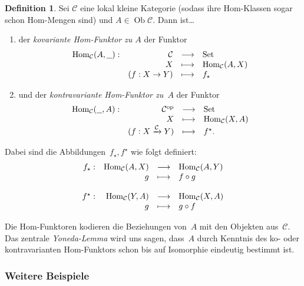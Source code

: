 \documentclass[a4paper,ngerman]{scrartcl}
\theoremstyle{definition}
\newtheorem{defn}{Definition}[section]
\theoremstyle{plain}
\theoremstyle{remark}
\newcommand{\xra}[1]{\xrightarrow{#1}}
\newcommand{\C}{\mathcal{C}}
\newcommand{\Hom}{\mathrm{Hom}}
\newcommand{\freist}{\underline{\ \ }}
\DeclareMathOperator{\Ob}{Ob}
\newcommand{\op}{\mathrm{op}}
\newcommand{\Set}{\mathrm{Set}}
\begin{document}
\begin{defn}
Sei $\C$ eine lokal kleine Kategorie (sodass ihre Hom-Klassen sogar schon
Hom-Mengen sind) und $A \in \Ob \C$. Dann ist\ldots
\begin{enumerate}
  \item der \emph{kovariante Hom-Funktor zu $A$} der Funktor
    \[ \begin{array}{@{}rrcl@{}}
      \Hom_\C(A,\freist): & \C &\longrightarrow& \Set \\
      & X &\longmapsto& \Hom_\C(A,X) \\
      & (f:X \to Y) &\longmapsto& f_\star
    \end{array} \]
  \item und der \emph{kontravariante Hom-Funktor zu~$A$} der Funktor
    \[ \begin{array}{@{}rrcl@{}}
      \Hom_\C(\freist,A): & \C^\op &\longrightarrow& \Set \\
      & X &\longmapsto& \Hom_\C(X,A) \\
      & (f:X \xra{\C} Y) &\longmapsto& f^\star.
    \end{array} \]
\end{enumerate}
Dabei sind die Abbildungen~$f_\star, f^\star$ wie folgt definiert:
\[ \begin{array}{@{}rrcl@{}}
  f_\star: & \Hom_\C(A,X) &\longrightarrow& \Hom_\C(A,Y) \\
  & g &\longmapsto& f \circ g \\
  \\
  f^\star: & \Hom_\C(Y,A) &\longrightarrow& \Hom_\C(X,A) \\
  & g &\longmapsto& g \circ f
\end{array} \]
\end{defn}

Die Hom-Funktoren kodieren die Beziehungen von~$A$ mit den Objekten aus~$\C$.
Das zentrale \emph{Yoneda-Lemma} wird uns sagen, dass~$A$ durch Kenntnis des
ko- oder kontravarianten Hom-Funktors schon bis auf Isomorphie eindeutig
bestimmt ist.


\subsubsection{Weitere Beispiele}
\end{document}
